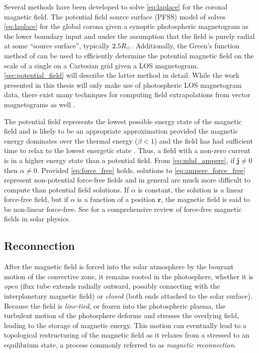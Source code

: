 Several methods have been developed to solve \autoref{eq:laplace} for the coronal magnetic field. The potential field source surface (PFSS) model of \citet{schatten_model_1969} solves \autoref{eq:laplace} for the global corona given a synoptic photospheric magnetogram as the lower boundary input and under the assumption that the field is purely radial at some ``source surface'', typically $2.5R_{\odot}$. Additionally, the Green's function method of \citet{schmidt_observable_1964} can be used to efficiently determine the potential magnetic field on the scale of a single \AR{} on a Cartesian grid given a LOS magnetogram. \autoref{sec:potential_field} will describe the latter method in detail. While the work presented in this thesis will only make use of photospheric LOS magnetogram data, there exist many techniques for computing field extrapolations from vector magnetograms as well \citep[see review by][]{welsch_deriving_2016}.

The potential field represents the lowest possible energy state of the magnetic field and is likely to be an appropriate approximation provided the magnetic energy dominates over the thermal energy ($\beta<1$) and the field has had sufficient time to relax to the lowest energetic state \citep{priest_magnetohydrodynamics_2014}. Thus, a field with a non-zero current is in a higher energy state than a potential field. From \autoref{eq:mhd_ampere}, if $\mathbf{j}\neq0$ then $\alpha\neq0$. Provided \autoref{eq:force_free} holds, solutions to \autoref{eq:ampere_force_free} represent non-potential force-free fields and in general are much more difficult to compute than potential field solutions. If $\alpha$ is constant, the solution is a linear force-free field, but if $\alpha$ is a function of a position $\mathbf{r}$, the magnetic field is said to be non-linear force-free. See \citet{wiegelmann_solar_2012} for a comprehensive review of force-free magnetic fields in solar physics.

\subsection{Reconnection}\label{sec:reconnection}

After the magnetic field is forced into the solar atmosphere by the bouyant motion of the convective zone, it remains rooted in the photosphere, whether it is \textit{open} (flux tube extends radially outward, possibly connecting with the interplanetary magnetic field) or \textit{closed} (both ends attached to the solar surface). Because the field is \textit{line-tied}, or frozen into the photospheric plasma, the turbulent motion of the photosphere deforms and stresses the overlying field, leading to the storage of magnetic energy. This motion can eventually lead to a topological restructuring of the magnetic field as it relaxes from a stressed to an equilibrium state, a process commonly referred to as \textit{magnetic reconnection}.

